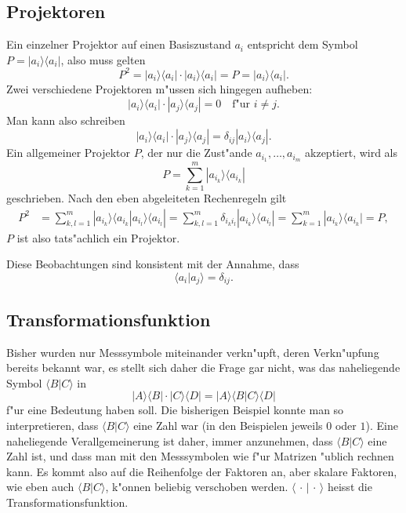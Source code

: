 \subsection{Projektoren}
Ein einzelner Projektor auf einen Basiszustand $a_i$ entspricht dem Symbol
$P= |a_i\rangle\langle a_i|$, also muss gelten
\[
P^2 = 
|a_i\rangle\langle a_i|
\cdot
|a_i\rangle\langle a_i|
=P
=
|a_i\rangle\langle a_i|.
\]
Zwei verschiedene Projektoren m"ussen sich hingegen aufheben:
\[
|a_i\rangle\langle a_i|
\cdot
|a_j\rangle\langle a_j|
=
0 \quad\text{f"ur $i\ne j$}.
\]
Man kann also schreiben
\[
|a_i\rangle\langle a_i|
\cdot
|a_j\rangle\langle a_j|
=\delta_{ij} |a_i\rangle\langle a_j|.
\]
Ein allgemeiner Projektor $P$, der nur die Zust"ande $a_{i_1},\dots ,a_{i_m}$
akzeptiert, wird als
\[
P = \sum_{k=1}^m |a_{i_k}\rangle \langle a_{i_k}|
\]
geschrieben.
Nach den eben abgeleiteten Rechenregeln gilt
\begin{align*}
P^2
&=
\sum_{k,l=1}^m |a_{i_k}\rangle\langle a_{i_k}|a_{i_l}\rangle\langle a_{i_l}|
=
\sum_{k,l=1}^m \delta_{i_ki_l}|a_{i_k}\rangle\langle a_{i_l}|
=
\sum_{k=1}^m |a_{i_k}\rangle\langle a_{i_k}| = P,
\end{align*}
$P$ ist also tats"achlich ein Projektor.

Diese Beobachtungen sind konsistent mit der Annahme, dass
\[
\langle a_i|a_j\rangle = \delta_{ij}.
\]

\subsection{Transformationsfunktion}
Bisher wurden nur Messsymbole miteinander verkn"upft, deren 
Verkn"upfung bereits bekannt war, es stellt sich daher die
Frage gar nicht, was das naheliegende Symbol $\langle B|C\rangle$
in
\[
|A\rangle\langle B|\cdot |C\rangle\langle D|
=
|A\rangle \langle B|C\rangle \langle D|
\]
f"ur eine Bedeutung haben soll. Die bisherigen Beispiel konnte
man so interpretieren, dass $\langle B|C\rangle$ eine Zahl war
(in den Beispielen jeweils $0$ oder $1$).
Eine naheliegende Verallgemeinerung ist daher, immer anzunehmen,
dass $\langle B|C\rangle$ eine Zahl ist, und dass man mit den
Messsymbolen wie f"ur Matrizen "ublich rechnen kann.
Es kommt also auf die Reihenfolge der Faktoren an, aber skalare
Faktoren, wie eben auch $\langle B|C\rangle$, k"onnen beliebig
verschoben werden.
$\langle \,\cdot\, |\,\cdot\, \rangle$ heisst die Transformationsfunktion.


